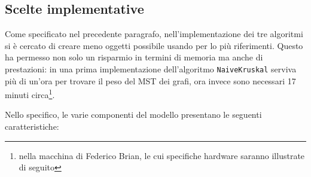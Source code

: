 \subsection{Scelte implementative}
Come specificato nel precedente paragrafo, nell'implementazione dei tre algoritmi si è cercato di creare meno oggetti possibile usando per lo più riferimenti. Questo ha permesso non solo un risparmio in termini di memoria ma anche di prestazioni: in una prima implementazione dell'algoritmo \texttt{NaiveKruskal} serviva più di un'ora per trovare il peso del MST dei grafi, ora invece sono necessari  17 minuti circa\footnote{nella macchina di Federico Brian, le cui specifiche hardware saranno illustrate di seguito}.\eqcapo

Nello specifico, le varie componenti del modello presentano le seguenti caratteristiche:
